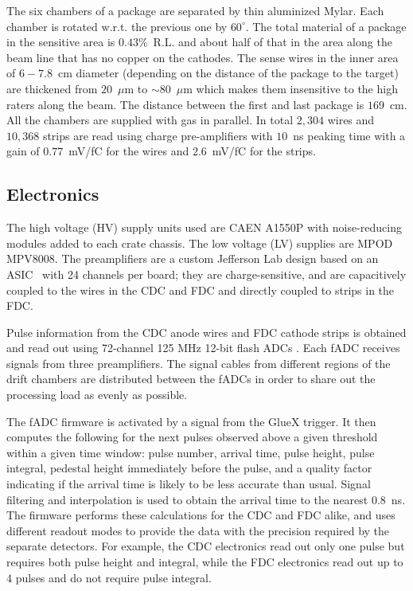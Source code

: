 The six chambers of a package are separated by thin aluminized Mylar.
Each chamber is rotated w.r.t. the previous one by $60^\circ $.
The total material of a package in the sensitive area is $0.43\%$~R.L. and about half of that in the area along the beam line that has no copper on the cathodes.
The sense wires in the inner area of $6-7.8$~cm diameter (depending on the distance of the package to the target) are thickened from $20$~$\mu$m to $\sim 80$~$\mu$m which makes them insensitive to the high raters along the beam.
The distance between the first and last package is $169$~cm. 
All the chambers are supplied with gas in parallel. 
In total $2,304$ wires and $10,368$ strips are read using charge pre-amplifiers with $10$~ns peaking time with a gain of $0.77$~mV/fC for the wires and $2.6$~mV/fC for the strips.

\subsection{Electronics \label{sec:dcelectronics}}
The high voltage (HV) supply units used are CAEN A1550P with noise-reducing modules added to each crate chassis. 
The low voltage (LV) supplies are MPOD MPV8008. 
The preamplifiers are a custom Jefferson Lab design based on an ASIC~\cite{hdnote2515}
with 24 channels per board; they are charge-sensitive, and are capacitively coupled to the wires in the CDC and FDC and directly coupled to strips in the FDC. 

Pulse information from the CDC anode wires and FDC cathode strips is obtained and read out using 72-channel 125 MHz 12-bit flash ADCs \cite{Visser2008,5873864}. 
Each fADC receives signals from three preamplifiers. 
The signal cables from different regions of the drift chambers are distributed between the fADCs in order to share out the processing load as evenly as possible.  

The fADC firmware is activated by a signal from the GlueX trigger. It then computes the following for the next pulses observed above a given threshold within a given time window: pulse number, arrival time, pulse height, pulse integral, pedestal height immediately before the pulse, and a quality factor indicating if the arrival time is likely to be less accurate than usual. 
Signal filtering and interpolation is used to obtain the arrival time to the nearest 0.8~ns. 
The firmware performs these calculations for the CDC and FDC alike, and uses different readout modes to provide the data with the precision required by the separate detectors. 
For example, the CDC electronics read out only one pulse but requires both pulse height and integral, while the FDC electronics read out up to 4 pulses and do not require pulse integral.  

